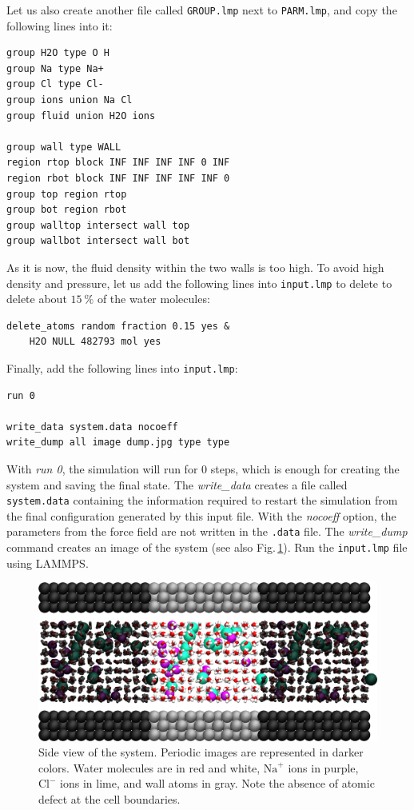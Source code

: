 \documentclass[9pt,tutorial]{livecoms}
\newcommand{\flecmd}[1]{\textcolor{command}{\texttt{#1}}} %
\begin{document}
Let us also create another file called \flecmd{GROUP.lmp} next to
\flecmd{PARM.lmp}, and copy the following lines into it:
\begin{lstlisting}
group H2O type O H
group Na type Na+
group Cl type Cl-
group ions union Na Cl
group fluid union H2O ions

group wall type WALL
region rtop block INF INF INF INF 0 INF
region rbot block INF INF INF INF INF 0
group top region rtop
group bot region rbot
group walltop intersect wall top
group wallbot intersect wall bot
\end{lstlisting}
As it is now, the fluid density within the two walls is too high. To avoid
high density and pressure, let us add the following lines into \flecmd{input.lmp}
to delete to delete about $15~\%$ of the water molecules:
\begin{lstlisting}
delete_atoms random fraction 0.15 yes &
    H2O NULL 482793 mol yes
\end{lstlisting}
Finally, add the following lines into \flecmd{input.lmp}:
\begin{lstlisting}
run 0

write_data system.data nocoeff
write_dump all image dump.jpg type type
\end{lstlisting}
With \textit{run 0}, the simulation will run for 0 steps, which is enough for
creating the system and saving the final state. The \textit{write\_data}
creates a file called \flecmd{system.data} containing the information required
to restart the simulation from the final configuration generated by this input
file. With the \textit{nocoeff} option, the parameters from the force field are
not written in the \flecmd{.data} file. The \textit{write\_dump} command creates
an image of the system (see also Fig.\,\ref{fig:NANOSHEAR-system}).
Run the \flecmd{input.lmp} file using LAMMPS.

\begin{figure}
\centering
\includegraphics[width=\linewidth]{NANOSHEAR-system}
\caption{Side view of the system. Periodic images are represented in darker colors.
Water molecules are in red and white, $\text{Na}^+$ ions in purple, $\text{Cl}^-$
ions in lime, and wall atoms in gray. Note the absence of atomic defect at the
cell boundaries.}
\label{fig:NANOSHEAR-system}
\end{figure}
\end{document}
